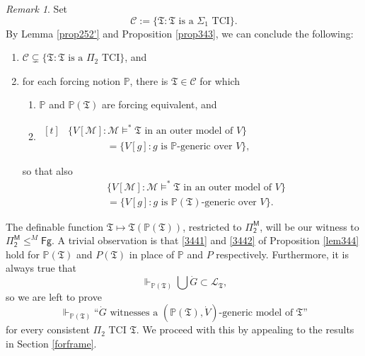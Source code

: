 \documentclass[12pt, twoside]{memoir}
\numberwithin{equation}{section}
\theoremstyle{definition}
\theoremstyle{remark}
\newtheorem{rem}[thm]{Remark}
\theoremstyle{definition}
\theoremstyle{definition}
\theoremstyle{definition}
\theoremstyle{remark}
\begin{document}
\begin{rem}
Set
\begin{equation*}
    \mathcal{C} := \{\mathfrak{T} : \mathfrak{T} \text{ is a } \Sigma_1 \text{ TCI}\} \text{.}
\end{equation*}
By Lemma \ref{prop252'} and Proposition \ref{prop343}, we can conclude the following:
\begin{enumerate}[label=(\arabic*)]
    \item $\mathcal{C} \subsetneq \{\mathfrak{T} : \mathfrak{T} \text{ is a } \Pi_2 \text{ TCI}\}$, and
    \item for each forcing notion $\mathbb{P}$, there is $\mathfrak{T} \in \mathcal{C}$ for which
    \begin{enumerate}[label=(\alph*)]
        \item $\mathbb{P}$ and $\mathbb{P}(\mathfrak{T})$ are forcing equivalent, and
        \item 
        \!
        $\begin{aligned}[t]
            & \{V[\mathcal{M}] : \mathcal{M} \models^* \mathfrak{T} \text{ in an outer model of } V\} \\
            & \mspace{70mu} = \{V[g] : g \text{ is } \mathbb{P} \text{-generic over } V\} \text{,}
        \end{aligned}$
    \end{enumerate}
    so that also
    \begin{align*}
        & \{V[\mathcal{M}] : \mathcal{M} \models^* \mathfrak{T} \text{ in an outer model of } V\} \\
        & = \{V[g] : g \text{ is } \mathbb{P}(\mathfrak{T}) \text{-generic over } V\} \text{.}
    \end{align*}
\end{enumerate} 
\end{rem}

The definable function $\mathfrak{T} \mapsto \mathfrak{T}(\mathbb{P}(\mathfrak{T}))$, restricted to $\mathsf{\Pi^M_2}$, will be our witness to $\mathsf{\Pi^M_2} \leq^M \mathsf{Fg}$. A trivial observation is that \ref{3441} and \ref{3442} of Proposition \ref{lem344} hold for $\mathbb{P}(\mathfrak{T})$ and $P(\mathfrak{T})$ in place of $\mathbb{P}$ and $P$ respectively. Furthermore, it is always true that
\begin{equation*}
    \Vdash_{\mathbb{P}(\mathfrak{T})} \bigcup \dot{G} \subset \mathcal{L}_{\mathfrak{T}} \text{,}
\end{equation*}
so we are left to prove
\begin{equation}\label{32}
    \Vdash_{\mathbb{P}(\mathfrak{T})} \text{``} \dot{G} \text{ witnesses a } (\mathbb{P}(\mathfrak{T}), \dot{V}) \text{-generic model of } \mathfrak{T} \text{''}
\end{equation}
for every consistent $\Pi_2$ TCI $\mathfrak{T}$. We proceed with this by appealing to the results in Section \ref{forframe}. 
\end{document}
